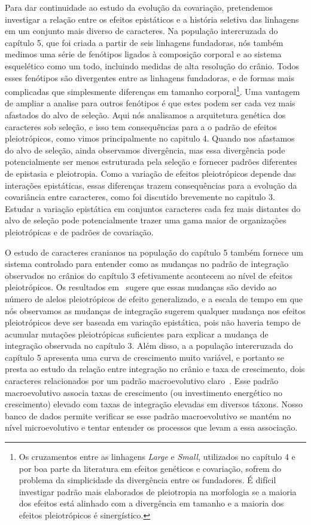 \begin{refsection}
Para dar continuidade ao estudo da evolução da covariação,
pretendemos investigar a relação entre os efeitos epistáticos e a história
seletiva das linhagens em um conjunto mais diverso de caracteres. Na população
intercruzada do capítulo 5, que foi criada a partir de seis linhagens
fundadoras, nós também medimos uma série de fenótipos ligados à composição
corporal e ao sistema esquelético como um todo, incluindo medidas de alta
resolução do crânio. Todos esses fenótipos são divergentes entre as linhagens
fundadoras, e de formas mais complicadas que simplesmente diferenças em
tamanho corporal\footnote{Os cruzamentos entre as linhagens \textit{Large} e
\textit{Small}, utilizados no capítulo 4 e por boa parte da literatura em
efeitos genéticos e covariação, sofrem do problema da simplicidade da
divergência entre os fundadores. É difícil investigar padrão mais elaborados
de pleiotropia na morfologia se a maioria dos efeitos está alinhado com a
divergência em tamanho e a maioria dos efeitos pleiotrópicos é sinergístico.}.
Uma vantagem de ampliar a analise para outros fenótipos é que estes podem ser
cada vez mais afastados do alvo de seleção. Aqui nós analisamos a arquitetura
genética dos caracteres sob seleção, e isso tem consequências para a o padrão
de efeitos pleiotrópicos, como vimos principalmente no capitulo 4. Quando nos
afastamos do alvo de seleção, ainda observamos divergência, mas essa
divergência pode potencialmente ser menos estruturada pela seleção e fornecer
padrões diferentes de epistasia e pleiotropia. Como a variação de efeitos
pleiotrópicos depende das interações epistáticas, essas diferenças trazem
consequências para a evolução da covariância entre caracteres, como foi
discutido brevemente no capitulo 3. Estudar a variação epistática em conjuntos
caracteres cada fez mais distantes do alvo de seleção pode potencialmente
trazer uma gama maior de organizações pleiotrópicas e de padrões de
covariação. 

O estudo de caracteres cranianos na população do capítulo 5 também fornece um
sistema controlado para entender como as mudanças no padrão de integração
observados no crânios do capítulo 3 efetivamente acontecem ao nível de efeitos
pleiotrópicos. Os resultados em~\textcite{Porto2016-qc} sugere que essas
mudanças são devido ao número de alelos pleiotrópicos de efeito generalizado,
e a escala de tempo em que nós observamos as mudanças de integração sugerem
qualquer mudança nos efeitos pleiotrópicos deve ser baseada em variação
epistática, pois não haveria tempo de acumular mutações pleiotrópicas
suficientes para explicar a mudança de integração observada no capítulo 3.
Além disso, a a população intercruzada do capítulo 5 apresenta uma curva de
crescimento muito variável, e portanto se presta ao estudo da relação entre
integração no crânio e taxa de crescimento, dois caracteres relacionados por
um padrão macroevolutivo claro~\parencite{Porto2013-dc}. Esse padrão
macroevolutivo associa taxas de crescimento (ou investimento energético no
crescimento) elevado com taxas de integração elevadas em diversos táxons.
Nosso banco de dados permite verificar se esse padrão macroevolutivo se mantém
no nível microevolutivo e tentar entender os processos que levam a essa
associação.


\end{refsection}
